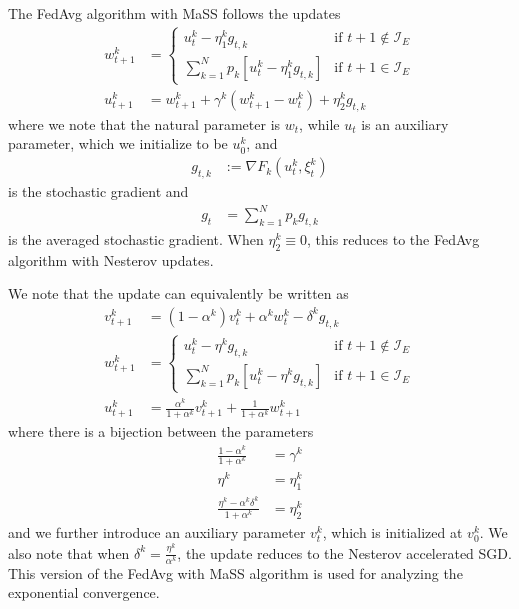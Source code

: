 The FedAvg algorithm with MaSS follows the updates
\begin{align*}
w_{t+1}^{k} & =\begin{cases}
u_{t}^{k}-\eta_{1}^{k}g_{t,k} & \text{if }t+1\notin\mathcal{I}_{E}\\
\sum_{k=1}^{N}p_{k}\left[u_{t}^{k}-\eta_{1}^{k}g_{t,k}\right] & \text{if }t+1\in\mathcal{I}_{E}
\end{cases}\\
u_{t+1}^{k} & =w_{t+1}^{k}+\gamma^{k}(w_{t+1}^{k}-w_{t}^{k})+\eta_{2}^{k}g_{t,k}
\end{align*}
 where we note that the natural parameter is $w_{t}$, while $u_{t}$
is an auxiliary parameter, which we initialize to be $u_{0}^{k}$,
and 
\begin{align*}
g_{t,k} & :=\nabla F_{k}(u_{t}^{k},\xi_{t}^{k})
\end{align*}
 is the stochastic gradient and 
\begin{align*}
g_{t} & =\sum_{k=1}^{N}p_{k}g_{t,k}
\end{align*}
is the averaged stochastic gradient. When $\eta_{2}^{k}\equiv0$,
this reduces to the FedAvg algorithm with Nesterov updates.

We note that the update can equivalently be written as 
\begin{align*}
v_{t+1}^{k} & =(1-\alpha^{k})v_{t}^{k}+\alpha^{k}w_{t}^{k}-\delta^{k}g_{t,k}\\
w_{t+1}^{k} & =\begin{cases}
u_{t}^{k}-\eta^{k}g_{t,k} & \text{if }t+1\notin\mathcal{I}_{E}\\
\sum_{k=1}^{N}p_{k}\left[u_{t}^{k}-\eta^{k}g_{t,k}\right] & \text{if }t+1\in\mathcal{I}_{E}
\end{cases}\\
u_{t+1}^{k} & =\frac{\alpha^{k}}{1+\alpha^{k}}v_{t+1}^{k}+\frac{1}{1+\alpha^{k}}w_{t+1}^{k}
\end{align*}
 where there is a bijection between the parameters 
\begin{align*}
\frac{1-\alpha^{k}}{1+\alpha^{k}} & =\gamma^{k}\\
\eta^{k} & =\eta_{1}^{k}\\
\frac{\eta^{k}-\alpha^{k}\delta^{k}}{1+\alpha^{k}} & =\eta_{2}^{k}
\end{align*}
 and we further introduce an auxiliary parameter $v_{t}^{k}$, which
is initialized at $v_{0}^{k}$. We also note that when $\delta^{k}=\frac{\eta^{k}}{\alpha^{k}}$,
the update reduces to the Nesterov accelerated SGD. This version of
the FedAvg with MaSS algorithm is used for analyzing the exponential
convergence. 

